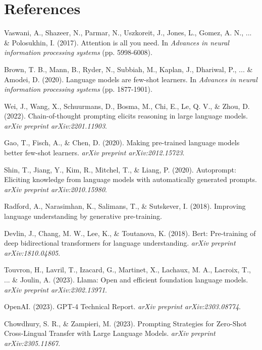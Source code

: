 \documentclass{article}
\begin{document}



\section*{References}

\begin{thebibliography}{9}

Vaswani, A., Shazeer, N., Parmar, N., Uszkoreit, J., Jones, L., Gomez, A. N., ... \& Polosukhin, I. (2017). Attention is all you need. In \textit{Advances in neural information processing systems} (pp. 5998-6008).

Brown, T. B., Mann, B., Ryder, N., Subbiah, M., Kaplan, J., Dhariwal, P., ... \& Amodei, D. (2020). Language models are few-shot learners. In \textit{Advances in neural information processing systems} (pp. 1877-1901).

Wei, J., Wang, X., Schuurmans, D., Bosma, M., Chi, E., Le, Q. V., \& Zhou, D. (2022). Chain-of-thought prompting elicits reasoning in large language models. \textit{arXiv preprint arXiv:2201.11903}.

Gao, T., Fisch, A., \& Chen, D. (2020). Making pre-trained language models better few-shot learners. \textit{arXiv preprint arXiv:2012.15723}.

Shin, T., Jiang, Y., Kim, R., Mitchel, T., \& Liang, P. (2020). Autoprompt: Eliciting knowledge from language models with automatically generated prompts. \textit{arXiv preprint arXiv:2010.15980}.

Radford, A., Narasimhan, K., Salimans, T., \& Sutskever, I. (2018). Improving language understanding by generative pre-training.

Devlin, J., Chang, M. W., Lee, K., \& Toutanova, K. (2018). Bert: Pre-training of deep bidirectional transformers for language understanding. \textit{arXiv preprint arXiv:1810.04805}.

Touvron, H., Lavril, T., Izacard, G., Martinet, X., Lachaux, M. A., Lacroix, T., ... \& Joulin, A. (2023). Llama: Open and efficient foundation language models. \textit{arXiv preprint arXiv:2302.13971}.

OpenAI. (2023). GPT-4 Technical Report. \textit{arXiv preprint arXiv:2303.08774}.

Chowdhury, S. R., \& Zampieri, M. (2023). Prompting Strategies for Zero-Shot Cross-Lingual Transfer with Large Language Models. \textit{arXiv preprint arXiv:2305.11867}.

\end{thebibliography}
\end{document}
